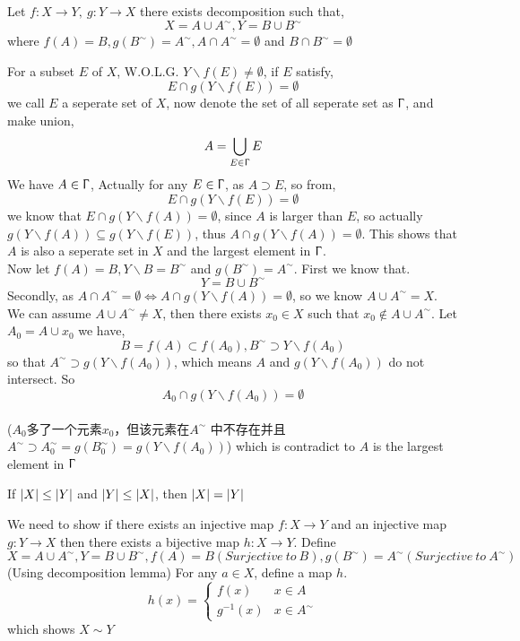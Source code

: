 \begin{myLemma}
	Let $f: X\rightarrow Y,\ g: Y\rightarrow X$ there exists decomposition such that,
	\[X = A\cup A^{\sim}, Y=B\cup B^{\sim}\]
	where $f(A)=B, g(B^\sim)=A^\sim, A\cap A^\sim=\emptyset$ and $B\cap B^\sim=\emptyset$
\end{myLemma}
\begin{myPf}
	For a subset $E$ of $X$, W.O.L.G. $Y\backslash f(E)\neq\emptyset$, if $E$ satisfy,
	\[E\cap g(Y\backslash f(E))=\emptyset\]
	we call $E$ a seperate set of $X$, now denote the set of all seperate set as $\Upgamma$, and make union,
	\[A=\bigcup_{E\in \Upgamma}E\]
	We have $A\in \Upgamma$, Actually for any $E\in \Upgamma$, as $A\supset E$, so from,
	\[E\cap g(Y\backslash f(E))=\emptyset\]
	we know that $E\cap g(Y\backslash f(A))=\emptyset$, since $A$ is larger than $E$, so actually $g(Y\backslash f(A))\subseteq g(Y\backslash f(E))$, thus $A\cap g(Y\backslash f(A))=\emptyset$. This shows that $A$ is also a seperate set in $X$ and the largest element in $\Upgamma$.
	\\
	Now let $f(A)=B, Y\backslash B=B^\sim$ and $g(B^\sim)=A^\sim$. First we know that.
	\[Y=B\cup B^\sim\]
	Secondly, as $A\cap A^\sim=\emptyset\Leftrightarrow A\cap g(Y\backslash f(A))=\emptyset$, so we know $A\cup A^\sim=X$.
	\\
	We can assume $A\cup A^\sim \neq X$, then there exists $x_0\in X$ such that $x_0\notin A\cup A^\sim$. Let $A_0=A\cup {x_0}$ we have,
	\[B=f(A)\subset f(A_0), B^\sim \supset Y\backslash f(A_0)\]
	so that $A^\sim \supset g(Y\backslash f(A_0))$, which means $A$ and $g(Y\backslash f(A_0))$ do not intersect. So
	\[A_0\cap g(Y\backslash f(A_0))=\emptyset\]
	\\($A_0$多了一个元素$x_0$，但该元素在$A^\sim$ 中不存在并且$A^\sim \supset A_0^\sim=g(B_0^\sim) = g(Y\backslash f(A_0))$)
	which is contradict to $A$ is the largest element in $\Upgamma$
\end{myPf}
\begin{myTheo}
	If $\lvert X\rvert\leq\lvert Y\rvert$ and $\lvert Y\rvert\leq\lvert X\rvert$, then $\lvert X\rvert=\lvert Y\rvert$
\end{myTheo}
\begin{myPf}
	We need to show if there exists an injective map $f: X\rightarrow Y$ and an injective map $g: Y\rightarrow X$ then there exists a bijective map $h: X\rightarrow Y$.
	\newline
	\newline
	Define $X=A\cup A^\sim, Y=B\cup B^\sim, f(A)=B(Surjective\ to\ B), g(B^\sim)=A^\sim(Surjective\ to\ A^\sim)$(Using decomposition lemma)
	\newline
	For any $a\in X$, define a map $h$.
	\[
	h(x)=\left.
	\begin{cases}
	f(x) & x\in A\\
	g^{-1}(x) & x\in A^\sim
	\end{cases}
	\right.
	\]
	which shows $X\sim Y$
\end{myPf}
